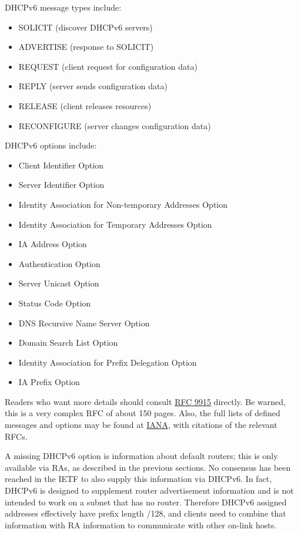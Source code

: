 \documentclass[
]{article}
\providecommand{\tightlist}{%
  \setlength{\itemsep}{0pt}\setlength{\parskip}{0pt}}
\begin{document}
DHCPv6 message types include:

\begin{itemize}
\tightlist
\item
  SOLICIT (discover DHCPv6 servers)
\item
  ADVERTISE (response to SOLICIT)
\item
  REQUEST (client request for configuration data)
\item
  REPLY (server sends configuration data)
\item
  RELEASE (client releases resources)
\item
  RECONFIGURE (server changes configuration data)
\end{itemize}

DHCPv6 options include:

\begin{itemize}
\tightlist
\item
  Client Identifier Option
\item
  Server Identifier Option
\item
  Identity Association for Non-temporary Addresses Option
\item
  Identity Association for Temporary Addresses Option
\item
  IA Address Option
\item
  Authentication Option
\item
  Server Unicast Option
\item
  Status Code Option
\item
  DNS Recursive Name Server Option
\item
  Domain Search List Option
\item
  Identity Association for Prefix Delegation Option
\item
  IA Prefix Option
\end{itemize}

Readers who want more details should consult
\href{https://www.rfc-editor.org/info/rfc9915}{RFC 9915} directly. Be
warned, this is a very complex RFC of about 150 pages. Also, the full
lists of defined messages and options may be found at
\href{https://www.iana.org/assignments/dhcpv6-parameters/dhcpv6-parameters.xhtml}{IANA},
with citations of the relevant RFCs.

A missing DHCPv6 option is information about default routers; this is
only available via RAs, as described in the previous sections. No
consensus has been reached in the IETF to also supply this information
via DHCPv6. In fact, DHCPv6 is designed to supplement router
advertisement information and is not intended to work on a subnet that
has no router. Therefore DHCPv6 assigned addresses effectively have
prefix length /128, and clients need to combine that information with RA
information to communicate with other on-link hosts.
\end{document}
